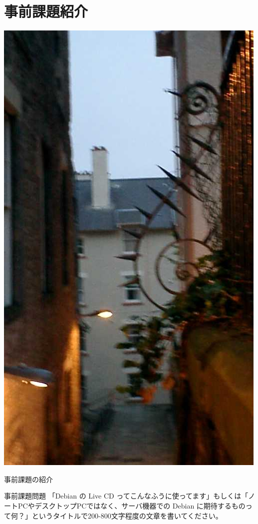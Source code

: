 \documentclass[cjk,dvipdfmx,12pt]{beamer}
\newcommand{\emtext}[1]{
\begin{frame}{}

\begin{minipage}{0.55\hsize}
\includegraphics[width=1\hsize]{image200707/gurutitle.jpg}
\end{minipage}
\begin{minipage}{0.39\hsize}
 {\Huge #1
 }
\end{minipage}
\end{frame}
}
\begin{document}
\section{事前課題紹介}
\emtext{事前課題の紹介}

\begin{frame}{事前課題問題}
「Debian の Live CD ってこんなふうに使ってます」もしくは「ノートPCやデスクトップPCではなく、サーバ機器での Debian に期待するものって何？」というタイトルで200-800文字程度の文章を書いてください。
\end{frame}

\end{document}
